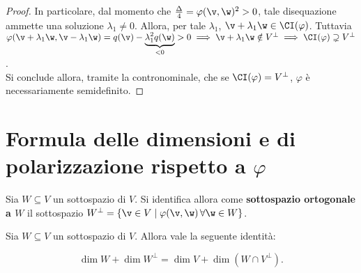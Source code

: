 \begin{proof}
	\vskip 0.05in
	
	In particolare, dal momento che $\frac{\Delta}{4} = \varphi(\v, \w)^2 > 0$, tale disequazione ammette
	una soluzione $\lambda_1 \neq 0$. Allora, per tale $\lambda_1$, $\v + \lambda_1 \w \in \CI(\varphi)$.
	Tuttavia $\varphi(\v + \lambda_1 \w, \v - \lambda_1 \w) = q(\v) - \underbrace{\lambda_1^2 q(\w)}_{<0} > 0 \implies
	\v + \lambda_1 \w \notin V^\perp \implies \CI(\varphi) \supsetneq V^\perp$. \\
	
	Si conclude allora, tramite la contronominale, che se $\CI(\varphi) = V^\perp$, $\varphi$
	è necessariamente semidefinito. 
\end{proof}

\section{Formula delle dimensioni e di polarizzazione rispetto a $\varphi$}

\begin{definition}
	Sia $W \subseteq V$ un sottospazio di $V$. Si identifica allora come \textbf{sottospazio ortogonale a $W$}
	il sottospazio $W^\perp = \{ \v \in V \mid \varphi(\v, \w) \, \forall \w \in W \}$.
\end{definition}

\begin{proposition}
	Sia $W \subseteq V$ un sottospazio di $V$. Allora vale la seguente identità:
	
	\[ \dim W + \dim W^\perp = \dim V + \dim (W \cap V^\perp). \]
\end{proposition}

